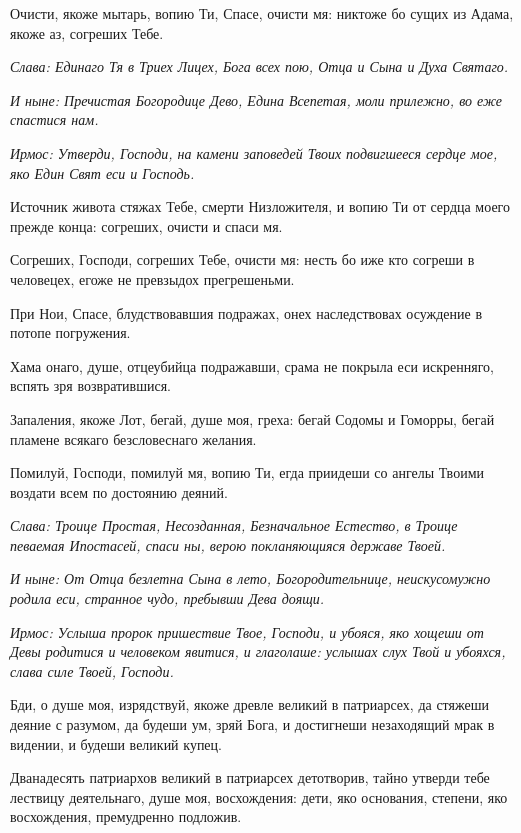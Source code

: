 Очисти, якоже мытарь, вопию Ти, Спасе, очисти мя: никтоже бо сущих из Адама, якоже аз, согреших Тебе. 

\itshape Слава\normalfont{}: Единаго Тя в Триех Лицех, Бога всех пою, Отца и Сына и Духа Святаго. 

\itshape И ныне\normalfont{}: Пречистая Богородице Дево, Едина Всепетая, моли прилежно, во еже спастися нам. 


\itshape Ирмос\normalfont{}: Утверди, Господи, на камени заповедей Твоих подвигшееся сердце мое, яко Един Свят еси и Господь. 

Источник живота стяжах Тебе, смерти Низложителя, и вопию Ти от сердца моего прежде конца: согреших, очисти и спаси мя. 

Согреших, Господи, согреших Тебе, очисти мя: несть бо иже кто согреши в человецех, егоже не превзыдох прегрешеньми. 

При Нои, Спасе, блудствовавшия подражах, онех наследствовах осуждение в потопе погружения. 

Хама онаго, душе, отцеубийца подражавши, срама не покрыла еси искренняго, вспять зря возвратившися. 

Запаления, якоже Лот, бегай, душе моя, греха: бегай Содомы и Гоморры, бегай пламене всякаго безсловеснаго желания. 

Помилуй, Господи, помилуй мя, вопию Ти, егда приидеши со ангелы Твоими воздати всем по достоянию деяний. 

\itshape Слава\normalfont{}: Троице Простая, Несозданная, Безначальное Естество, в Троице певаемая Ипостасей, спаси ны, верою покланяющияся державе Твоей. 

\itshape И ныне\normalfont{}: От Отца безлетна Сына в лето, Богородительнице, неискусомужно родила еси, странное чудо, пребывши Дева доящи. 


\itshape Ирмос\normalfont{}: Услыша пророк пришествие Твое, Господи, и убояся, яко хощеши от Девы родитися и человеком явитися, и глаголаше: услышах слух Твой и убояхся, слава силе Твоей, Господи. 

Бди, о душе моя, изрядствуй, якоже древле великий в патриарсех, да стяжеши деяние с разумом, да будеши ум, зряй Бога, и достигнеши незаходящий мрак в видении, и будеши великий купец. 

Дванадесять патриархов великий в патриарсех детотворив, тайно утверди тебе лествицу деятельнаго, душе моя, восхождения: дети, яко основания, степени, яко восхождения, премудренно подложив. 

